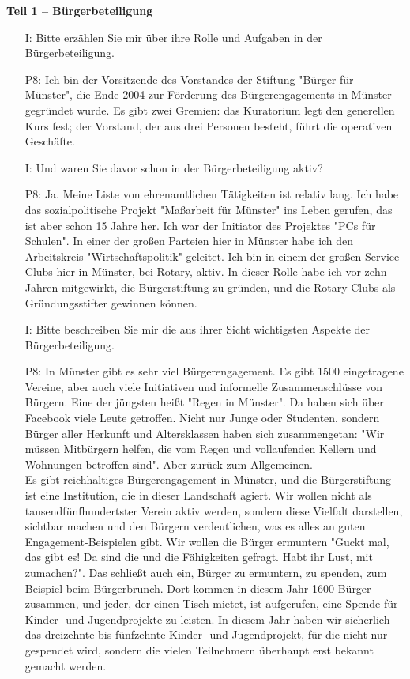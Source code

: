 \textbf{Teil 1 -- B{\"u}rgerbeteiligung}
\begin{itemize}
    \item[I:] Bitte erz{\"a}hlen Sie mir {\"u}ber ihre Rolle und Aufgaben in der B{\"u}rgerbeteiligung.
    \item[P8:] Ich bin der Vorsitzende des Vorstandes der Stiftung "B{\"u}rger f{\"u}r M{\"u}nster", die Ende 2004 zur F{\"o}rderung des B{\"u}rgerengagements in M{\"u}nster gegr{\"u}ndet wurde. Es gibt zwei Gremien: das Kuratorium legt den generellen Kurs fest; der Vorstand, der aus drei Personen besteht, f{\"u}hrt die operativen Gesch{\"a}fte.
    \item[I:] Und waren Sie davor schon in der B{\"u}rgerbeteiligung aktiv?
    \item[P8:] Ja. Meine Liste von ehrenamtlichen T{\"a}tigkeiten ist relativ lang. Ich habe das sozialpolitische Projekt "Ma{\ss}arbeit f{\"u}r M{\"u}nster" ins Leben gerufen, das ist aber schon 15 Jahre her. Ich war der Initiator des Projektes "PCs f{\"u}r Schulen". In einer der gro{\ss}en Parteien hier in M{\"u}nster habe ich den Arbeitskreis "Wirtschaftspolitik" geleitet. Ich bin in einem der gro{\ss}en Service-Clubs hier in M{\"u}nster, bei Rotary, aktiv. In dieser Rolle habe ich vor zehn Jahren mitgewirkt, die B{\"u}rgerstiftung zu gr{\"u}nden, und die Rotary-Clubs als Gr{\"u}ndungsstifter gewinnen k{\"o}nnen.
    \item[I:] Bitte beschreiben Sie mir die aus ihrer Sicht wichtigsten Aspekte der B{\"u}rgerbeteiligung.
    \item[P8:] In M{\"u}nster gibt es sehr viel B{\"u}rgerengagement. Es gibt 1500 eingetragene Vereine, aber auch viele Initiativen und informelle Zusammenschl{\"u}sse von B{\"u}rgern. Eine der j{\"u}ngsten hei{\ss}t "Regen in M{\"u}nster". Da haben sich {\"u}ber Facebook viele Leute getroffen. Nicht nur Junge oder Studenten, sondern B{\"u}rger aller Herkunft und Altersklassen haben sich zusammengetan: "Wir m{\"u}ssen Mitb{\"u}rgern helfen, die vom Regen und vollaufenden Kellern und Wohnungen betroffen sind". Aber zur{\"u}ck zum Allgemeinen.\\
    Es gibt reichhaltiges B{\"u}rgerengagement in M{\"u}nster, und die B{\"u}rgerstiftung ist eine Institution, die in dieser Landschaft agiert. Wir wollen nicht als tausendf{\"u}nfhundertster Verein aktiv werden, sondern diese Vielfalt darstellen, sichtbar machen und den B{\"u}rgern verdeutlichen, was es alles an guten Engagement-Beispielen gibt. Wir wollen die B{\"u}rger ermuntern "Guckt mal, das gibt es! Da sind die und die F{\"a}higkeiten gefragt. Habt ihr Lust, mit zumachen?". Das schlie{\ss}t auch ein, B{\"u}rger zu ermuntern, zu spenden, zum Beispiel beim B{\"u}rgerbrunch. Dort kommen in diesem Jahr 1600 B{\"u}rger zusammen, und jeder, der einen Tisch mietet, ist aufgerufen, eine Spende f{\"u}r Kinder- und Jugendprojekte zu leisten. In diesem Jahr haben wir sicherlich das dreizehnte bis f{\"u}nfzehnte Kinder- und Jugendprojekt, f{\"u}r die nicht nur gespendet wird, sondern die vielen Teilnehmern {\"u}berhaupt erst bekannt gemacht werden.\\

\end{itemize}
